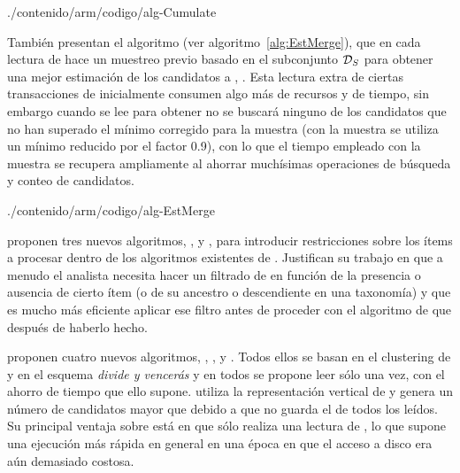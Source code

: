 
                 {./contenido/arm/codigo/alg-Cumulate}

También presentan el algoritmo  (ver algoritmo~\ref{alg:EstMerge}), que en cada lectura de \D hace un muestreo previo basado en el subconjunto $\D_S$ para obtener una mejor estimación de los candidatos a \kitemset, \aprioriC. Esta lectura extra de ciertas transacciones de \D inicialmente consumen algo más de recursos y de tiempo, sin embargo cuando se lee \D para obtener \aprioriL[k] no se buscará ninguno de los candidatos que no han superado el \soporte mínimo corregido para la muestra (con la muestra se utiliza un \soporte mínimo reducido por el factor 0.9), con lo que el tiempo empleado con la muestra se recupera ampliamente al ahorrar muchísimas operaciones de búsqueda y conteo de candidatos.


                 {./contenido/arm/codigo/alg-EstMerge}


\citet{SrikantVuAgrawal-MininARWithItemConstraints-1997} proponen tres nuevos algoritmos, ,  y , para introducir restricciones sobre los ítems a procesar dentro de los algoritmos existentes de \ARM. Justifican su trabajo en que a menudo el analista necesita hacer un filtrado de \ars en función de la presencia o ausencia de cierto ítem (o de su ancestro o descendiente en una taxonomía) y que es mucho más eficiente aplicar ese filtro antes de proceder con el algoritmo de \ARM que después de haberlo hecho.


\citet{ZakiParthasarathyOgiharaL-NewAlgorithms-1997} proponen cuatro nuevos algoritmos, , ,  y . Todos ellos se basan en el clustering de \itemsets y en el esquema \textsl{divide y vencerás} y en todos se propone leer \D sólo una vez, con el ahorro de tiempo que ello supone.  utiliza la representación vertical de \D y genera un número de candidatos mayor que \apriori debido a que no guarda el \soporte de todos los \itemsets leídos. Su principal ventaja sobre \apriori está en que sólo realiza una lectura de \D, lo que supone una ejecución más rápida en general en una época en que el acceso a disco era aún demasiado costosa.


